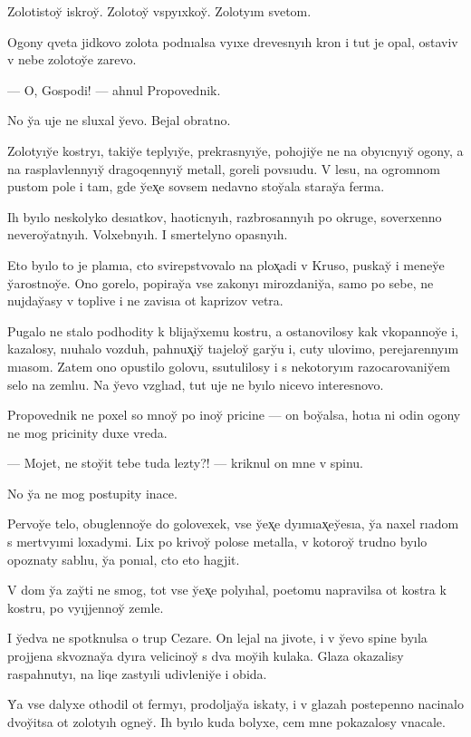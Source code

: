 \documentclass[10pt]{book}
\begin{document}
Zolotistoy̆ iskroy̆. Zolotoy̆ vspyıxkoy̆. Zolotyım svetom.

Ogony qveta jidkovo zolota podnıalsa vyıxe drevesnyıh kron i tut je opal, ostaviv v nebe zolotoy̆e zarevo.

— O, Gospodi! — ahnul Propovednik.

No y̆a uje ne sluxal y̆evo. Bejal obratno.



Zolotyıy̆e kostryı, takiy̆e teplyıy̆e, prekrasnyıy̆e, pohojiy̆e ne na obyıcnyıy̆ ogony, a na rasplavlennyıy̆ dragoqennyıy̆ metall, goreli povsıudu. V lesu, na ogromnom pustom pole i tam, gde y̆ex̨e sovsem nedavno stoy̆ala staray̆a ferma.

Ih byılo neskolyko desıatkov, haoticnyıh, razbrosannyıh po okruge, soverxenno neveroy̆atnyıh. Volxebnyıh. I smertelyno opasnyıh.

Eto byılo to je plamıa, cto svirepstvovalo na plox̨adi v Kruso, puskay̆ i meney̆e y̆arostnoy̆e. Ono gorelo, popiray̆a vse zakonyı mirozdaniy̆a, samo po sebe, ne nujday̆asy v toplive i ne zavisıa ot kaprizov vetra.

Pugalo ne stalo podhodity k blijay̆xemu kostru, a ostanovilosy kak vkopannoy̆e i, kazalosy, nıuhalo vozduh, pahnux̨iy̆ tıajeloy̆ gary̆u i, cuty ulovimo, perejarennyım mıasom. Zatem ono opustilo golovu, ssutulilosy i s nekotoryım razocarovaniy̆em selo na zemlıu. Na y̆evo vzglıad, tut uje ne byılo nicevo interesnovo.

Propovednik ne poxel so mnoy̆ po inoy̆ pricine — on boy̆alsa, hotıa ni odin ogony ne mog pricinity duxe vreda.

— Mojet, ne stoy̆it tebe tuda lezty?! — kriknul on mne v spinu.

No y̆a ne mog postupity inace.

Pervoy̆e telo, obuglennoy̆e do golovexek, vse y̆ex̨e dyımıax̨ey̆esıa, y̆a naxel rıadom s mertvyımi loxadymi. Lix po krivoy̆ polose metalla, v kotoroy̆ trudno byılo opoznaty sablıu, y̆a ponıal, cto eto hagjit.

V dom y̆a zay̆ti ne smog, tot vse y̆ex̨e polyıhal, poetomu napravilsa ot kostra k kostru, po vyıjjennoy̆ zemle.

I y̆edva ne spotknulsa o trup Cezare. On lejal na jivote, i v y̆evo spine byıla projjena skvoznay̆a dyıra velicinoy̆ s dva moy̆ih kulaka. Glaza okazalisy raspahnutyı, na liqe zastyıli udivleniy̆e i obida.

Y̆a vse dalyxe othodil ot fermyı, prodoljay̆a iskaty, i v glazah postepenno nacinalo dvoy̆itsa ot zolotyıh ogney̆. Ih byılo kuda bolyxe, cem mne pokazalosy vnacale.
\end{document}
